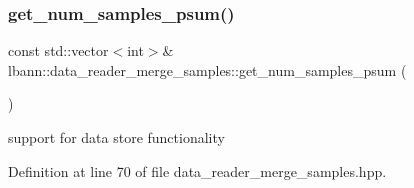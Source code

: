 \subsubsection{\texorpdfstring{get\+\_\+num\+\_\+samples\+\_\+psum()}{get\_num\_samples\_psum()}}
{\footnotesize\ttfamily const std\+::vector$<$int$>$\& lbann\+::data\+\_\+reader\+\_\+merge\+\_\+samples\+::get\+\_\+num\+\_\+samples\+\_\+psum (\begin{DoxyParamCaption}{ }\end{DoxyParamCaption})\hspace{0.3cm}{\ttfamily [inline]}}



support for data store functionality 



Definition at line 70 of file data\+\_\+reader\+\_\+merge\+\_\+samples.\+hpp.


